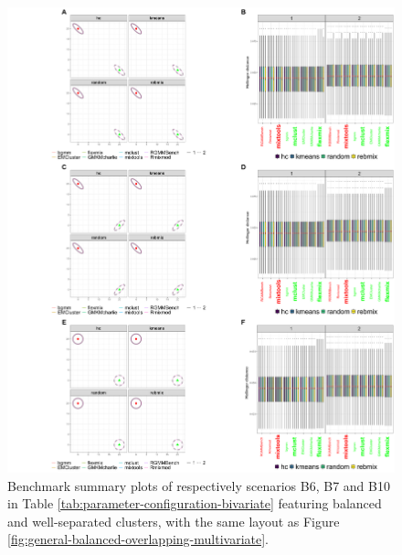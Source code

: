 \newpage

\begin{figure}

{\centering \includegraphics[width=1\linewidth]{figs/multivariate/multivariate_balanced_well_separated} 

}

\caption{Benchmark summary plots of respectively scenarios B6, B7 and B10 in Table \ref{tab:parameter-configuration-bivariate} featuring balanced and well-separated clusters, with the same layout as Figure \ref{fig:general-balanced-overlapping-multivariate}.}\label{fig:general-balanced-well-separated-multivariate}
\end{figure}

\newpage

